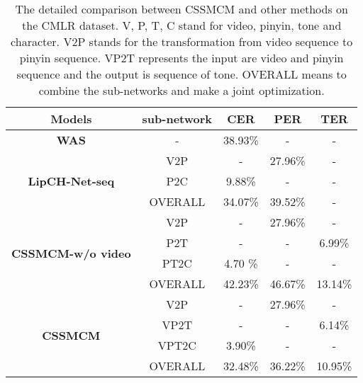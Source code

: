 \documentclass[sigconf]{acmart}
\begin{document}
\begin{table}[htb]
\small
\centering
\caption {The detailed comparison between CSSMCM and other methods on the CMLR dataset. V, P, T, C stand for video, pinyin, tone and character. V2P stands for the transformation from video sequence to pinyin sequence. VP2T represents the input are video and pinyin sequence and the output is sequence of tone. OVERALL means to combine the sub-networks and make a joint optimization.}
\label{table:comparison}
\begin{tabular}{c | c | c | c | c}
  \hline 
  \textbf{Models} & \textbf{sub-network} & \textbf{CER} & \textbf{PER} & \textbf{TER} \\ \hline \hline
    \textbf{WAS}             &       -   &   38.93\%  &   -        &      -    \\ \hline \hline
    
    \multirow{3}{*}{\textbf{LipCH-Net-seq}}  &  V2P      &     -     &   27.96\% &     -    \\ 
                                    &  P2C      &    9.88\% &      -    &     -    \\
                                    &  OVERALL & 34.07\%    & 39.52\%   &   -    \\\hline \hline
                                    
    \multirow{4}{*}{\textbf{CSSMCM-w/o video}}&  V2P     &     -     &   27.96\% &     -    \\ 
                                    &  P2T      &    -      &      -    &     6.99\%     \\
                                    &  PT2C     &   4.70 \% &     -     &     -\\
                                    & OVERALL   & 42.23\%   & 46.67\%   &   13.14\%  \\\hline \hline
                                    
    \multirow{4}{*}{\textbf{CSSMCM}}         &   V2P     &     -     &   27.96\%  &     -    \\ 
                                    &   VP2T    &    -      &      -     &     6.14\%    \\
                                    &   VPT2C   &  3.90\%   &       -    &      - \\
                                    &   OVERALL & 32.48\%   &   36.22\%  &  10.95\%  \\\hline 
    
\end{tabular} 
\end{table}
\end{document}
